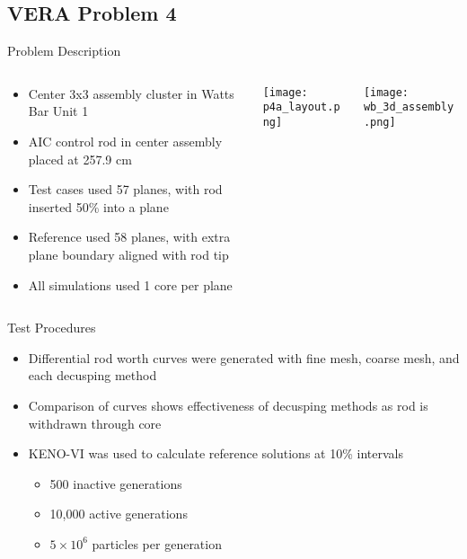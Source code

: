 \subsection{VERA Problem 4}
\begin{frame}[t]{Problem Description}
    
\begin{columns}
    \begin{column}{0.5\textwidth}
        \begin{itemize}
            \item Center 3x3 assembly cluster in Watts Bar Unit 1
            \item AIC control rod in center assembly placed at 257.9 cm
            \item Test cases used 57 planes, with rod inserted 50\% into a plane
            \item Reference used 58 planes, with extra plane boundary aligned 
            with rod tip
            \item All simulations used 1 core per plane
        \end{itemize}
    \end{column}
    \begin{column}{0.28\textwidth}
        \texttt{[image: p4a\_layout.png]}
    \end{column}
    \begin{column}{0.22\textwidth}
        \texttt{[image: wb\_3d\_assembly.png]}
\end{column}
\end{columns}
    
\end{frame}


\begin{frame}[t]{Test Procedures}
    
    \begin{itemize}
        \item Differential rod worth curves were generated with fine mesh, coarse mesh, and each decusping method
        \item Comparison of curves shows effectiveness of decusping methods as rod is withdrawn through core
        \item KENO-VI was used to calculate reference solutions at 10\% intervals
        \begin{itemize}
            \item 500 inactive generations
            \item 10,000 active generations
            \item $5\times 10^6$ particles per generation
        \end{itemize}
    \end{itemize}

\end{frame}

